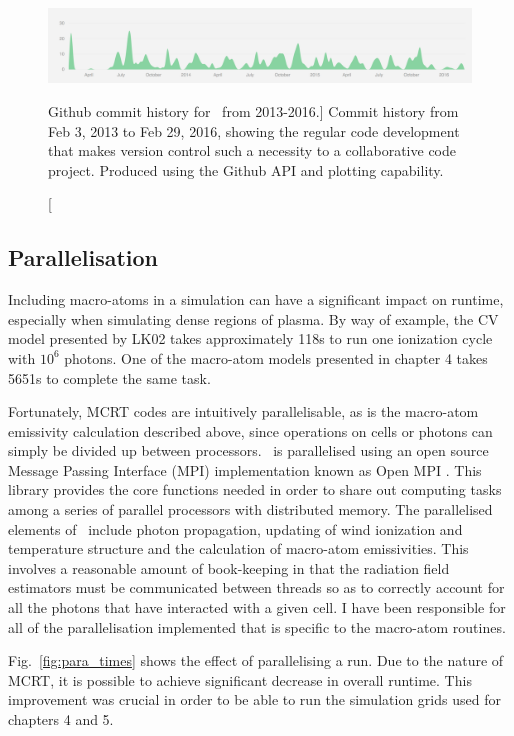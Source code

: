 \begin{figure}
\centering
\includegraphics[width=1.0\textwidth]{figures/03-radtrans/github1.png}
\caption
[Github commit history for \py\ from 2013-2016.]
{
Commit history from Feb 3, 2013 to Feb 29, 2016, showing the regular code development
that makes version control such a necessity to a collaborative code project. Produced
using the Github API and plotting capability.
} 
\label{fig:github}
\end{figure}

\subsection{Parallelisation} 
\label{sec:parallel}

Including macro-atoms in a simulation can have a significant impact 
on runtime, especially when simulating dense regions of plasma. 
By way of example, the CV model presented by LK02 takes approximately
118s to run one ionization cycle with $10^6$ photons. One of the macro-atom 
models presented in chapter 4 takes 5651s to complete the same task. 

Fortunately, MCRT codes are intuitively parallelisable, as is the macro-atom
emissivity calculation described above, since operations on cells or photons can
simply be divided up between processors. \py\ is parallelised using an open 
source Message Passing Interface (MPI) implementation known as 
Open MPI \citep{openmpi}. This library provides the core functions needed
in order to share out computing tasks among a series of parallel processors
with distributed memory. The parallelised elements of \py\ include
photon propagation, updating of wind ionization and temperature structure
and the calculation of macro-atom emissivities. This involves
a reasonable amount of book-keeping in that the radiation field estimators 
must be communicated between threads so as to correctly account for all
the photons that have interacted with a given cell. I have been responsible
for all of the parallelisation implemented that is
specific to the macro-atom routines.

Fig.~\ref{fig:para_times} shows the effect of parallelising a run. Due to the nature of MCRT,
it is possible to achieve significant decrease in overall 
runtime. This improvement was crucial in order to be able to run the simulation
grids used for chapters 4 and 5.



